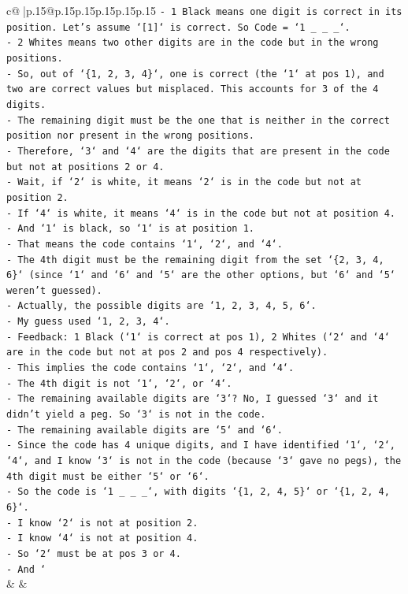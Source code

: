 \documentclass{article}
\begin{document}
{\begin{supertabular}{c@{$\;$}|p{.15\linewidth}@{}p{.15\linewidth}p{.15\linewidth}p{.15\linewidth}p{.15\linewidth}p{.15\linewidth}}
{{{\texttt{{-} 1 Black means one digit is correct in its position. Let's assume `{[}1{]}` is correct. So Code = `1 \_ \_ \_`.} \\
\texttt{{-} 2 Whites means two other digits are in the code but in the wrong positions.} \\
\texttt{{-} So, out of `\{1, 2, 3, 4\}`, one is correct (the `1` at pos 1), and two are correct values but misplaced. This accounts for 3 of the 4 digits.} \\
\texttt{{-} The remaining digit must be the one that is neither in the correct position nor present in the wrong positions.} \\
\texttt{{-} Therefore, `3` and `4` are the digits that are present in the code but not at positions 2 or 4.} \\
\texttt{{-} Wait, if `2` is white, it means `2` is in the code but not at position 2.} \\
\texttt{{-} If `4` is white, it means `4` is in the code but not at position 4.} \\
\texttt{{-} And `1` is black, so `1` is at position 1.} \\
\texttt{{-} That means the code contains `1`, `2`, and `4`.} \\
\texttt{{-} The 4th digit must be the remaining digit from the set `\{2, 3, 4, 6\}` (since `1` and `6` and `5` are the other options, but `6` and `5` weren't guessed).} \\
\texttt{{-} Actually, the possible digits are `1, 2, 3, 4, 5, 6`.} \\
\texttt{{-} My guess used `1, 2, 3, 4`.} \\
\texttt{{-} Feedback: 1 Black (`1` is correct at pos 1), 2 Whites (`2` and `4` are in the code but not at pos 2 and pos 4 respectively).} \\
\texttt{{-} This implies the code contains `1`, `2`, and `4`.} \\
\texttt{{-} The 4th digit is not `1`, `2`, or `4`.} \\
\texttt{{-} The remaining available digits are `3`? No, I guessed `3` and it didn't yield a peg. So `3` is not in the code.} \\
\texttt{{-} The remaining available digits are `5` and `6`.} \\
\texttt{{-} Since the code has 4 unique digits, and I have identified `1`, `2`, `4`, and I know `3` is not in the code (because `3` gave no pegs), the 4th digit must be either `5` or `6`.} \\
\texttt{{-} So the code is `1 \_ \_ \_`, with digits `\{1, 2, 4, 5\}` or `\{1, 2, 4, 6\}`.} \\
\texttt{{-} I know `2` is not at position 2.} \\
\texttt{{-} I know `4` is not at position 4.} \\
\texttt{{-} So `2` must be at pos 3 or 4.} \\
\texttt{{-} And `} \\
            }
        }
    }
    & & \\ \\


\end{supertabular}}
\end{document}
